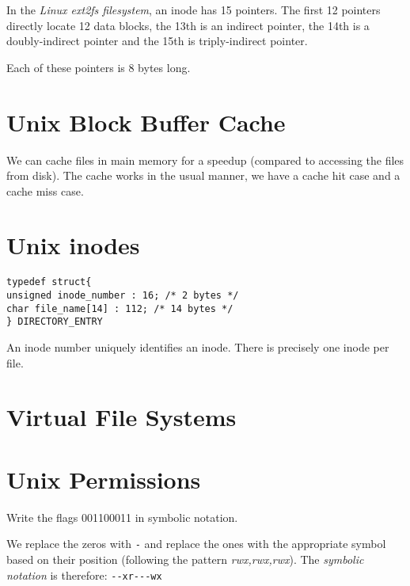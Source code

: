 \begin{example}
In the \textit{Linux ext2fs filesystem}, an inode has 15 pointers.
The first 12 pointers directly locate 12 data blocks, 
the 13th is an indirect pointer, the 14th is a doubly-indirect pointer and the 
15th is triply-indirect pointer. 

Each of these pointers is 8 bytes long.

\end{example}




\section{Unix Block Buffer Cache}

We can cache files in main memory for a speedup (compared to accessing the files 
from disk). The cache works in the usual manner, we have a cache hit case and a 
cache miss case.



\section{Unix inodes}


\begin{lstlisting}
typedef struct{
unsigned inode_number : 16; /* 2 bytes */
char file_name[14] : 112; /* 14 bytes */
} DIRECTORY_ENTRY
\end{lstlisting}

An inode number uniquely identiﬁes an inode.
There is precisely one inode per ﬁle.

\section{Virtual File Systems}


\section{Unix Permissions}




\begin{example}
Write the flags 001100011 in symbolic notation.

We replace the zeros with \lstinline{-} and replace the ones with the 
appropriate symbol based on their position 
(following the pattern \textit{rwx,rwx,rwx}). 
The \textit{symbolic notation} is therefore: \lstinline{--xr---wx}

\end{example}

